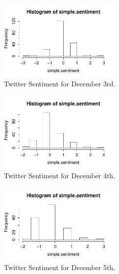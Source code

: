 \documentclass{article}\usepackage[]{graphicx}\usepackage[]{color}
\begin{document}
\begin{figure}[h!]
\caption{Twitter Sentiment for December 3rd.}
\includegraphics[width=6cm]{12-3.pdf}
\centering
\end{figure}

\begin{figure}[h!]
\caption{Twitter Sentiment for December 4th.}
\includegraphics[width=6cm]{12-4.pdf}
\centering
\end{figure}

\begin{figure}[H!]
\caption{Twitter Sentiment for December 5th.}
\includegraphics[width=6cm]{12-5.pdf}
\centering
\end{figure}
 
\end{document}
